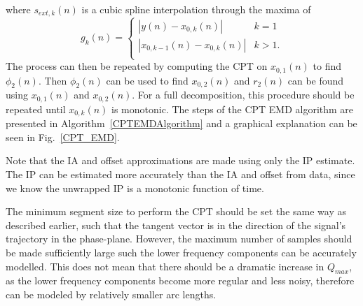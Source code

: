 \documentclass[journal,11pt,a4paper,onecolumn,draftcls]{IEEEtran}
\begin{document}
where $s_{ext,k}(n)$ is a cubic spline interpolation through the maxima of
\begin{equation}
    g_k(n) = \left\{ \begin{array}{*{20}{c}}
    {|y(n) - x_{0,k}(n)|} & {k=1} \\
    {|x_{0,k-1}(n) - x_{0,k}(n)|} & {k>1}. \\
    \end{array} \right.
\end{equation}
The process can then be repeated by computing the CPT on $x_{0,1}(n)$ to find $\phi_2(n)$. Then $\phi_2(n)$ can be used to  find $x_{0,2}(n)$ and $r_2(n)$ can be found using $x_{0,1}(n)$ and $x_{0,2}(n)$. For a full decomposition, this procedure should be repeated until $x_{0,k}(n)$ is monotonic. The steps of the CPT EMD algorithm are presented in Algorithm~\ref{CPTEMDAlgorithm} and a graphical explanation can be seen in Fig.~\ref{CPT_EMD}.

Note that the IA and offset approximations are made using only the IP estimate. The IP can be estimated more accurately than the IA and offset from data, since we know the unwrapped IP is a monotonic function of time.

The minimum segment size to perform the CPT should be set the same way as described earlier, such that the tangent vector is in the direction of the signal's trajectory in the phase-plane. However, the maximum number of samples should be made sufficiently large such the lower frequency components can be accurately modelled. This does not mean that there should be a dramatic increase in $Q_{max}$, as the lower frequency components become more regular and less noisy, therefore can be modeled by relatively smaller arc lengths.
\end{document}
